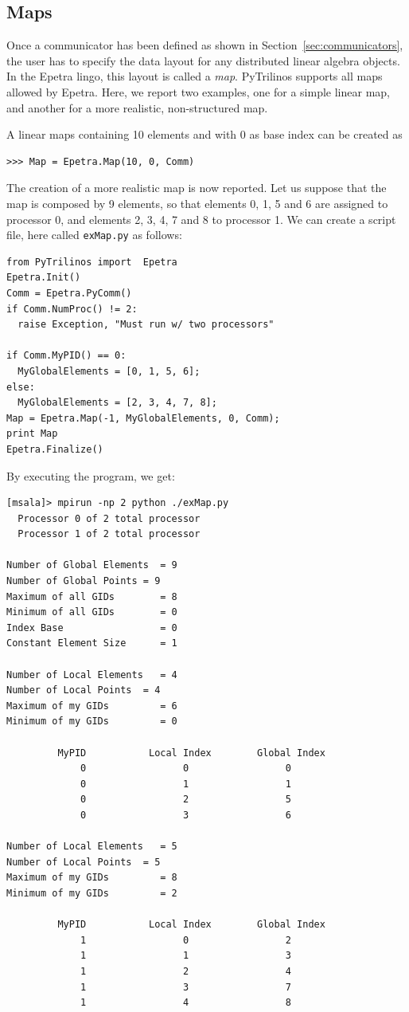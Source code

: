 \documentclass[10pt,relax]{SANDreport}
\begin{document}
\subsection{Maps}
\label{sec:maps}

Once a communicator has been defined as shown in
Section~\ref{sec:communicators}, the user has to specify the data layout for
any distributed linear algebra objects. In the Epetra lingo, this layout is
called a {\sl map}. PyTrilinos supports all maps allowed by Epetra. Here, we
report two examples, one for a simple linear map, and another for a more
realistic, non-structured map.

A linear maps containing 10
elements and with 0 as base index can be created as 
\begin{verbatim}
>>> Map = Epetra.Map(10, 0, Comm)
\end{verbatim}
The creation of a more realistic map is now reported. Let us suppose that the
map is composed by 9 elements, so that elements 0, 1, 5 and 6 are assigned to
processor 0, and elements 2, 3, 4, 7 and 8 to processor 1. We can create a
script file, here called {\tt exMap.py} as follows:
\begin{verbatim}
from PyTrilinos import  Epetra
Epetra.Init()
Comm = Epetra.PyComm()
if Comm.NumProc() != 2:
  raise Exception, "Must run w/ two processors"

if Comm.MyPID() == 0:
  MyGlobalElements = [0, 1, 5, 6];
else:
  MyGlobalElements = [2, 3, 4, 7, 8];
Map = Epetra.Map(-1, MyGlobalElements, 0, Comm);
print Map
Epetra.Finalize()
\end{verbatim}
By executing the program, we get:
\begin{verbatim}
[msala]> mpirun -np 2 python ./exMap.py
  Processor 0 of 2 total processor
  Processor 1 of 2 total processor

Number of Global Elements  = 9
Number of Global Points = 9
Maximum of all GIDs        = 8
Minimum of all GIDs        = 0
Index Base                 = 0
Constant Element Size      = 1

Number of Local Elements   = 4
Number of Local Points  = 4
Maximum of my GIDs         = 6
Minimum of my GIDs         = 0

         MyPID           Local Index        Global Index
             0                 0                 0
             0                 1                 1
             0                 2                 5
             0                 3                 6

Number of Local Elements   = 5
Number of Local Points  = 5
Maximum of my GIDs         = 8
Minimum of my GIDs         = 2

         MyPID           Local Index        Global Index
             1                 0                 2
             1                 1                 3
             1                 2                 4
             1                 3                 7
             1                 4                 8
\end{verbatim}
\end{document}
